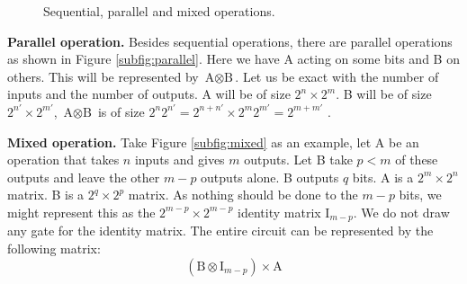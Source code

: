 \documentclass{easyclass}
\begin{document}
\begin{figure}[h]
	\centering
	\hspace{0.05\textwidth}
	\hspace{0.05\textwidth}
	\caption{Sequential, parallel and mixed operations.}
	\label{fig:sequential-parallel-mixed-operations}
\end{figure}

\textbf{Parallel operation.} Besides sequential operations, there are parallel operations as shown in Figure \ref{subfig:parallel}. Here we have A acting on some bits and B on others. This will be represented by $\textrm{A}\otimes \textrm{B}$. Let us be exact with the number of inputs and the number of outputs. A will be of size $2^n\times2^m$. B will be of size $2^{n'}\times2^{m'}$, $\textrm{A}\otimes \textrm{B}$ is of size $2^n2^{n'} = 2^{n+n'}\times 2^m2^{m'} = 2^{m+m'}$ .

\textbf{Mixed operation.} Take Figure \ref{subfig:mixed} as an example, let A be an operation that takes $n$ inputs and gives $m$ outputs. Let B take $p < m$ of these outputs and leave the other $m-p$ outputs alone. B outputs $q$ bits. A is a $2^m\times 2^n$ matrix. B is a $2^q\times 2^p$ matrix. As nothing should be done to the $m-p$ bits, we might represent this as the $2^{m-p}\times 2^{m-p}$ identity matrix $\textrm{I}_{m-p}$. We do not draw any gate for the identity matrix. The entire circuit can be represented by the following matrix:
\begin{equation}
	(\textrm{B}\otimes \textrm{I}_{m-p})\times \textrm{A}
\end{equation}
\end{document}
